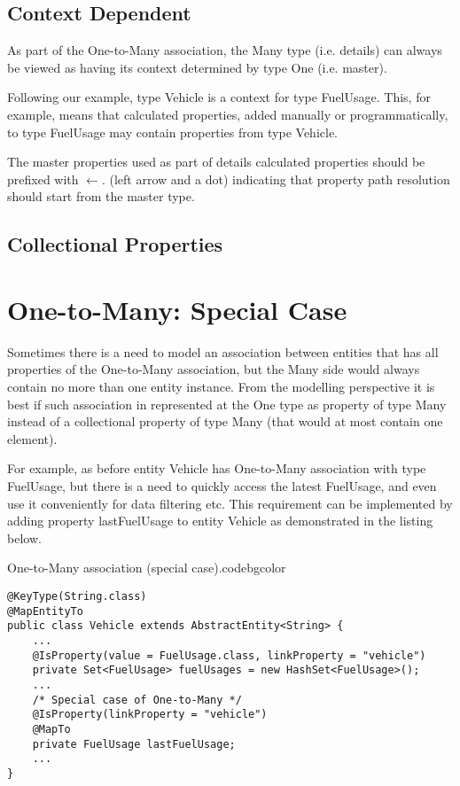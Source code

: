   \subsection{Context Dependent}

  As part of the One-to-Many association, the Many type (i.e. details) can always be viewed as having its context determined by type One (i.e. master).

  Following our example, type Vehicle is a context for type FuelUsage. This, for example, means that calculated properties, added manually or programmatically, to type FuelUsage may contain properties from type Vehicle.

  The master properties used as part of details calculated properties should be prefixed with $\leftarrow.$ (left arrow and a dot) indicating that property path resolution should start from the master type.

  \subsection{Collectional Properties}
  

\section{One-to-Many: Special Case}

  Sometimes there is a need to model an association between entities that has all properties of the One-to-Many association, but the Many side would always contain no more than one entity instance. From the modelling perspective it is best if such association in represented at the One type as property of type Many instead of a collectional property of type Many (that would at most contain one element).

  For example, as before entity Vehicle has One-to-Many association with type FuelUsage, but there is a need to quickly access the latest FuelUsage, and even use it conveniently for data filtering etc. This requirement can be implemented by adding property lastFuelUsage to entity Vehicle as demonstrated in the listing below.

  \begin{code}{One-to-Many association (special case).}{\label{lst:One2ManySpecialCase}}{codebgcolor}
    \begin{lstlisting}
@KeyType(String.class)
@MapEntityTo
public class Vehicle extends AbstractEntity<String> {
    ...
    @IsProperty(value = FuelUsage.class, linkProperty = "vehicle") 
    private Set<FuelUsage> fuelUsages = new HashSet<FuelUsage>();   
    ...
    /* Special case of One-to-Many */
    @IsProperty(linkProperty = "vehicle")
    @MapTo
    private FuelUsage lastFuelUsage;   
    ...
} 
    \end{lstlisting}
  \end{code}

